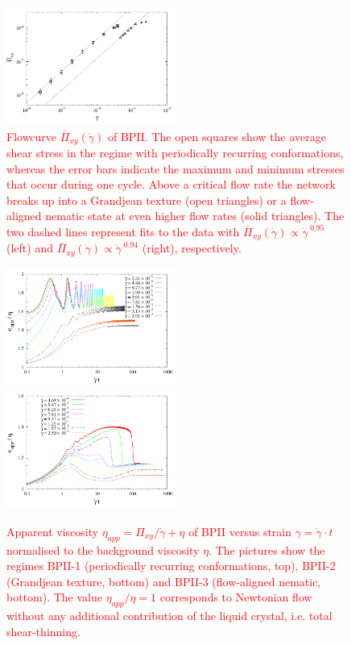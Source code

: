\documentclass[8.5pt,twoside,twocolumn]{article}
\newcommand{\gd}{\dot{\gamma}}
\newcommand{\rev}[1]{{\textcolor{red}{#1}}}
\begin{document}
\begin{figure}[htpb]
\includegraphics[width=0.495\textwidth]{flowcurve_bp2.pdf}
\caption{
\rev{
Flowcurve $\bar{\Pi}_{xy}(\gd)$ of BPII. The open squares show the average shear stress in the regime with periodically recurring conformations,
whereas the error bars indicate the maximum and minimum stresses that occur during one cycle. Above a critical flow rate the network  
breaks up into a Grandjean texture (open triangles) or a flow-aligned nematic state at even higher flow rates (solid triangles).
The two dashed lines represent fits to the data with $\bar{\Pi}_{xy}(\gd)\propto \gd^{\;0.95}$ (left) and $\bar{\Pi}_{xy}(\gd)\propto \gd^{\;0.94}$ (right), respectively.
}
}
\label{bp2-flowcurve}
\end{figure}

\begin{figure}[htpb]
\includegraphics[width=0.495\textwidth]{app_visc_strain_bp2_a.pdf}\\
\includegraphics[width=0.495\textwidth]{app_visc_strain_bp2_b.pdf}\\
\caption{
\rev{
Apparent viscosity $\eta_{app}=\Pi_{xy}/\gd + \eta$ 
of BPII versus strain $\gamma = \gd\cdot t$  
normalised to the background viscosity $\eta$.
The pictures show the regimes BPII-1 (periodically recurring conformations, top), BPII-2 (Grandjean texture, bottom) and BPII-3 (flow-aligned nematic, bottom). 
The value $\eta_{app}/\eta=1$ corresponds to Newtonian flow without any additional contribution of the liquid crystal, i.e. total shear-thinning.
}
} 
\label{bp2-appvisc}
\end{figure}
\end{document}
